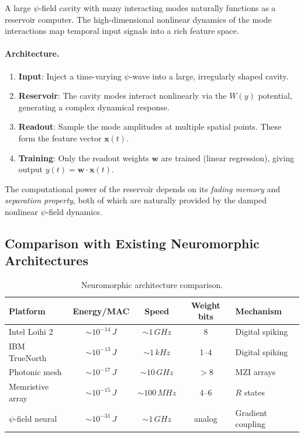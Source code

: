 \documentclass[12pt,a4paper,twoside]{article}
\begin{document}
A large $\psi$-field cavity with many interacting modes naturally functions as a reservoir computer. The high-dimensional nonlinear dynamics of the mode interactions map temporal input signals into a rich feature space.

\paragraph{Architecture.}
\begin{enumerate}
\item \textbf{Input}: Inject a time-varying $\psi$-wave into a large, irregularly shaped cavity.
\item \textbf{Reservoir}: The cavity modes interact nonlinearly via the $W(y)$ potential, generating a complex dynamical response.
\item \textbf{Readout}: Sample the mode amplitudes at multiple spatial points. These form the feature vector $\mathbf{x}(t)$.
\item \textbf{Training}: Only the readout weights $\mathbf{w}$ are trained (linear regression), giving output $y(t) = \mathbf{w} \cdot \mathbf{x}(t)$.
\end{enumerate}

The computational power of the reservoir depends on its \emph{fading memory} and \emph{separation property}, both of which are naturally provided by the damped nonlinear $\psi$-field dynamics.

\subsection{Comparison with Existing Neuromorphic Architectures}\label{sec:neuro_comparison}

\begin{table}[H]
\centering
\caption{Neuromorphic architecture comparison.}
\label{tab:neuro}
\begin{tabular}{lcccl}
\toprule
\textbf{Platform} & \textbf{Energy/MAC} & \textbf{Speed} & \textbf{Weight bits} & \textbf{Mechanism} \\
\midrule
Intel Loihi 2 & $\sim 10^{-14}\,\si{J}$ & $\sim 1\,\si{GHz}$ & 8 & Digital spiking \\
IBM TrueNorth & $\sim 10^{-13}\,\si{J}$ & $\sim 1\,\si{kHz}$ & 1--4 & Digital spiking \\
Photonic mesh & $\sim 10^{-17}\,\si{J}$ & $\sim 10\,\si{GHz}$ & $>8$ & MZI arrays \\
Memristive array & $\sim 10^{-15}\,\si{J}$ & $\sim 100\,\si{MHz}$ & 4--6 & $R$ states \\
$\psi$-field neural & $\sim 10^{-31}\,\si{J}$ & $\sim 1\,\si{GHz}$ & analog & Gradient coupling \\
\bottomrule
\end{tabular}
\end{table}
\end{document}
